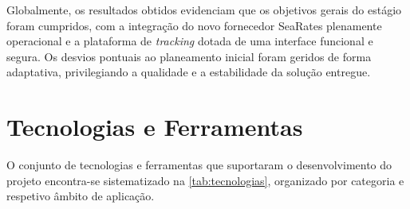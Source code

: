 \documentclass[a4paper,12pt]{report}
\begin{document}
Globalmente, os resultados obtidos evidenciam que os objetivos gerais do estágio foram cumpridos, com a integração do novo fornecedor SeaRates plenamente operacional e a plataforma de \textit{tracking} dotada de uma interface funcional e segura. Os desvios pontuais ao planeamento inicial foram geridos de forma adaptativa, privilegiando a qualidade e a estabilidade da solução entregue.

\section{Tecnologias e Ferramentas}

O conjunto de tecnologias e ferramentas que suportaram o desenvolvimento do projeto encontra-se sistematizado na \autoref{tab:tecnologias}, organizado por categoria e respetivo âmbito de aplicação.
\end{document}
